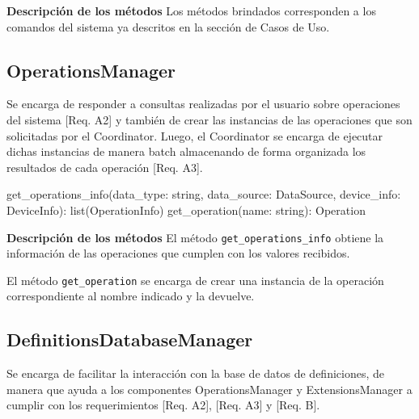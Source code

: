 \textbf{Descripción de los métodos} \newline
Los métodos brindados corresponden a los comandos del sistema ya descritos en la sección de Casos de Uso.

\subsection{OperationsManager}
Se encarga de responder a consultas realizadas por el usuario sobre operaciones del sistema [Req. A2] y también de crear las instancias de las operaciones que son solicitadas por el Coordinator. Luego, el Coordinator se encarga de ejecutar dichas instancias de manera batch almacenando de forma organizada los resultados de cada operación [Req. A3].
\newline

\begin{python}[title=Interfaz OperationsManager, captionpos=b]
get_operations_info(data_type: string, data_source: DataSource, 
                    device_info: DeviceInfo): list(OperationInfo)
get_operation(name: string): Operation
\end{python}

\textbf{Descripción de los métodos} \newline
El método \texttt{get\_operations\_info} obtiene la información de las operaciones que cumplen con los valores recibidos.

El método \texttt{get\_operation} se encarga de crear una instancia de la operación correspondiente al nombre indicado y la devuelve.

\subsection{DefinitionsDatabaseManager}
Se encarga de facilitar la interacción con la base de datos de definiciones, de manera que ayuda a los componentes OperationsManager y ExtensionsManager a cumplir con los requerimientos [Req. A2], [Req. A3] y [Req. B].
\newline


